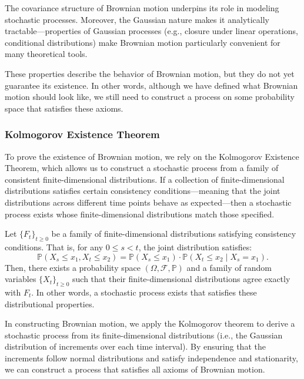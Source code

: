 \documentclass{article}
\begin{document}
The covariance structure of Brownian motion underpins its role in modeling stochastic processes. Moreover, the Gaussian nature makes it analytically tractable—properties of Gaussian processes (e.g., closure under linear operations, conditional distributions) make Brownian motion particularly convenient for many theoretical tools.

These properties describe the behavior of Brownian motion, but they do not yet guarantee its existence. In other words, although we have defined what Brownian motion should look like, we still need to construct a process on some probability space that satisfies these axioms.

\subsubsection*{Kolmogorov Existence Theorem}

To prove the existence of Brownian motion, we rely on the Kolmogorov Existence Theorem, which allows us to construct a stochastic process from a family of consistent finite-dimensional distributions. If a collection of finite-dimensional distributions satisfies certain consistency conditions—meaning that the joint distributions across different time points behave as expected—then a stochastic process exists whose finite-dimensional distributions match those specified.

\begin{theorem}
Let $\{F_t\}_{t \geq 0}$ be a family of finite-dimensional distributions satisfying consistency conditions. That is, for any $0 \leq s < t$, the joint distribution satisfies:
\[
\mathbb{P}(X_s \leq x_1, X_t \leq x_2) = \mathbb{P}(X_s \leq x_1) \cdot \mathbb{P}(X_t \leq x_2 \mid X_s = x_1).
\]
Then, there exists a probability space $(\Omega, \mathcal{F}, \mathbb{P})$ and a family of random variables $\{X_t\}_{t \geq 0}$ such that their finite-dimensional distributions agree exactly with $F_t$. In other words, a stochastic process exists that satisfies these distributional properties.
\end{theorem}

In constructing Brownian motion, we apply the Kolmogorov theorem to derive a stochastic process from its finite-dimensional distributions (i.e., the Gaussian distribution of increments over each time interval). By ensuring that the increments follow normal distributions and satisfy independence and stationarity, we can construct a process that satisfies all axioms of Brownian motion.
\end{document}

